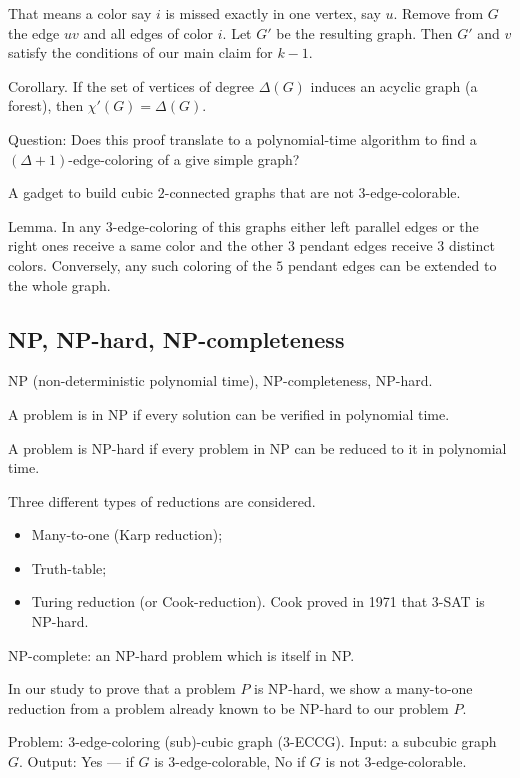 \documentclass[12pt,a4paper]{article}
\begin{document}
That means a color say \(i\) is missed exactly in one vertex, say \(u\). Remove
from \(G\) the edge \(u v\) and all edges of color \(i\). Let \(G'\) be the
resulting graph. Then \(G'\) and \(v\) satisfy the conditions of our main claim
for \(k-1\).

Corollary. If the set of vertices of degree \(\Delta(G)\) induces an acyclic
graph (a forest), then \(\chi'(G) = \Delta(G)\).

Question: Does this proof translate to a polynomial-time algorithm to find a
\((\Delta + 1)\)-edge-coloring of a give simple graph?

A gadget to build cubic \(2\)-connected graphs that are not
\(3\)-edge-colorable.

Lemma. In any \(3\)-edge-coloring of this graphs either left parallel edges or
the right ones receive a same color and the other \(3\) pendant edges receive
\(3\) distinct colors. Conversely, any such coloring of the \(5\) pendant edges
can be extended to the whole graph.

\subsection{NP, NP-hard, NP-completeness}

NP (non-deterministic polynomial time), NP-completeness, NP-hard.

A problem is in NP if every solution can be verified in polynomial time.

A problem is NP-hard if every problem in NP can be reduced to it in polynomial
time.

Three different types of reductions are considered.
\begin{itemize}
\item Many-to-one (Karp reduction);
\item Truth-table;
\item Turing reduction (or Cook-reduction). Cook proved in 1971 that \(3\)-SAT
  is NP-hard.
\end{itemize}

NP-complete: an NP-hard problem which is itself in NP.\@

In our study to prove that a problem \(P\) is NP-hard, we show a many-to-one
reduction from a problem already known to be NP-hard to our problem \(P\).

Problem: \(3\)-edge-coloring (sub)-cubic graph (\(3\)-ECCG).
Input: a subcubic graph \(G\).
Output: Yes --- if \(G\) is \(3\)-edge-colorable, No if \(G\) is not
\(3\)-edge-colorable.
\end{document}

